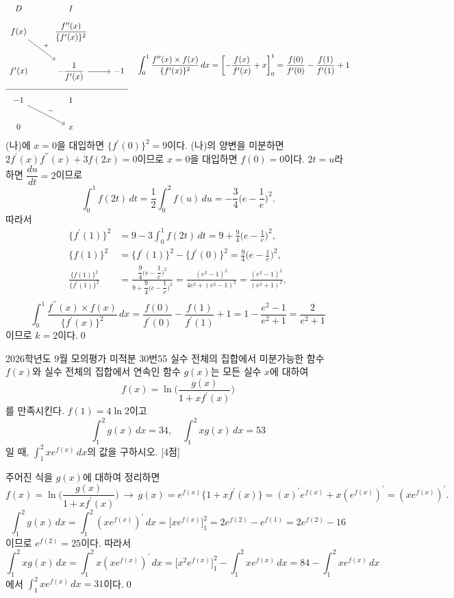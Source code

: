 \documentclass{article}
\begin{document}
\begin{sol}
	\[
		\begin{tikzcd}
			D & I & \\[-12pt]
			f(x) \arrow[rd, "+"] & \dfrac{f^{\prime\prime}(x)}{\{f^\prime(x)\}^2} & \\
			f^\prime(x) & -\dfrac{1}{f^\prime(x)} \arrow[r] & -1 \\[-12pt] \hline \\[-12pt]
			-1 \arrow[rd, "-"] & 1 & \\
			0 & x &
		\end{tikzcd}\quad \int_0^1\frac{f^{\prime\prime}(x)\times f(x)}{\{f^{\prime}(x)\}^2}\,dx=\biggl[-\frac{f(x)}{f^{\prime}(x)}+x\biggr]_0^1=\frac{f(0)}{f^{\prime}(0)}-\frac{f(1)}{f^{\prime}(1)}+1
	\]
	(나)에 $x=0$을 대입하면 $\{f^{\prime}(0)\}^2=9$이다. (나)의 양변을 미분하면 $2f^{\prime}(x)f^{\prime\prime}(x)+3f(2x)=0$이므로 $x=0$을 대입하면 $f(0)=0$이다. $2t=u$라 하면 $\dfrac{du}{dt}=2$이므로
	\[
		\int_0^1f(2t)\,dt=\frac{1}{2}\int_0^2f(u)\,du=-\frac{3}{4}\biggl(e-\frac{1}{e}\biggr)^2.
	\]
	따라서
	\[
		\begin{aligned}
			\{f^{\prime}(1)\}^2&=9-3\int_0^1f(2t)\,dt=9+\frac{9}{4}\biggl(e-\frac{1}{e}\biggr)^2,\\[3pt]
			\{f(1)\}^2&=\{f^{\prime}(1)\}^2-\{f^{\prime}(0)\}^2=\frac{9}{4}\biggl(e-\frac{1}{e}\biggr)^2,\\[3pt]
			\frac{\{f(1)\}^2}{\{f^{\prime}(1)\}^2}&=\frac{\dfrac{9}{4}\biggl(e-\dfrac{1}{e}\biggr)^2}{9+\dfrac{9}{4}\biggl(e-\dfrac{1}{e}\biggr)^2}=\frac{(e^2-1)^2}{4e^2+(e^2-1)^2}=\frac{(e^2-1)^2}{(e^2+1)^2},\\[3pt]
		\end{aligned}
	\]
	\[
		\int_0^1\frac{f^{\prime\prime}(x)\times f(x)}{\{f^{\prime}(x)\}^2}\,dx=\frac{f(0)}{f^{\prime}(0)}-\frac{f(1)}{f^{\prime}(1)}+1=1-\frac{e^2-1}{e^2+1}=\frac{2}{e^2+1}
	\]
	이므로 $k=2$이다.\qed
\end{sol}

\newpage
\begin{prob}{2026학년도 9월 모의평가 미적분 30번}{55}
	실수 전체의 집합에서 미분가능한 함수 $f(x)$와 실수 전체의 집합에서 연속인 함수 $g(x)$는 모든 실수 $x$에 대하여
	\[
		f(x)=\ln\biggl(\frac{g(x)}{1+xf^\prime(x)}\biggr)
	\]
	를 만족시킨다. $f(1)=4\ln2$이고
	\[
		\int_1^2g(x)\,dx=34,\quad\int_1^2xg(x)\,dx=53
	\]
	일 때, $\displaystyle\int_1^2xe^{f(x)}\,dx$의 값을 구하시오. [4점]
\end{prob}

\begin{sol}
	주어진 식을 $g(x)$에 대하여 정리하면
	\[
		f(x)=\ln\biggl(\frac{g(x)}{1+xf^\prime(x)}\biggr)~\longrightarrow~g(x)=e^{f(x)}\{1+xf^\prime(x)\}=(x)^\prime e^{f(x)}+x(e^{f(x)})^\prime=(xe^{f(x)})^\prime.
	\]
	\[
		\int_1^2g(x)\,dx=\int_1^2(xe^{f(x)})^\prime\,dx=\biggl[xe^{f(x)}\biggr]_1^2=2e^{f(2)}-e^{f(1)}=2e^{f(2)}-16
	\]
	이므로 $e^{f(2)}=25$이다. 따라서
	\[
		\int_1^2xg(x)\,dx=\int_1^2x(xe^{f(x)})^\prime\,dx=\biggl[x^2e^{f(x)}\biggr]_1^2-\int_1^2xe^{f(x)}\,dx=84-\int_1^2xe^{f(x)}\,dx
	\]
	에서 $\displaystyle\int_1^2xe^{f(x)}\,dx=31$이다.\qed
\end{sol}
\end{document}
